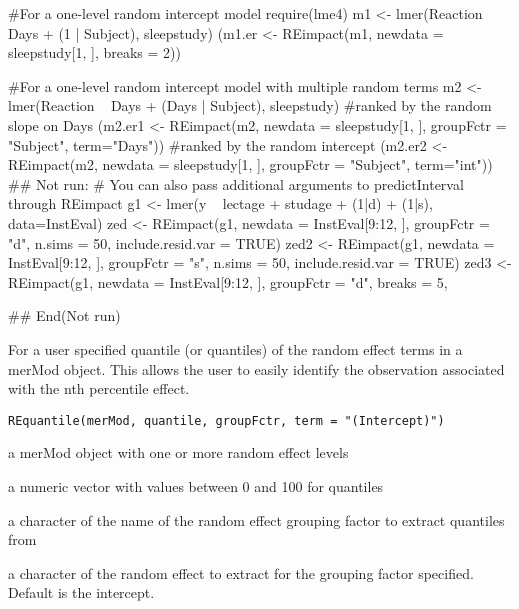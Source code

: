 \documentclass[letterpaper]{book}
\begin{document}
\begin{Examples}
\begin{ExampleCode}
#For a one-level random intercept model
require(lme4)
m1 <- lmer(Reaction ~ Days + (1 | Subject), sleepstudy)
(m1.er <- REimpact(m1, newdata = sleepstudy[1, ], breaks = 2))

#For a one-level random intercept model with multiple random terms
m2 <- lmer(Reaction ~ Days + (Days | Subject), sleepstudy)
#ranked by the random slope on Days
(m2.er1 <- REimpact(m2,  newdata = sleepstudy[1, ],
           groupFctr = "Subject", term="Days"))
#ranked by the random intercept
(m2.er2 <- REimpact(m2, newdata = sleepstudy[1, ],
             groupFctr = "Subject", term="int"))
## Not run: 
# You can also pass additional arguments to predictInterval through REimpact
g1 <- lmer(y ~ lectage + studage + (1|d) + (1|s), data=InstEval)
zed <- REimpact(g1, newdata = InstEval[9:12, ], groupFctr = "d", n.sims = 50,
                include.resid.var = TRUE)
zed2 <- REimpact(g1, newdata = InstEval[9:12, ], groupFctr = "s", n.sims = 50,
                 include.resid.var = TRUE)
zed3 <- REimpact(g1, newdata = InstEval[9:12, ], groupFctr = "d", breaks = 5,

## End(Not run)

\end{ExampleCode}
\end{Examples}
%
\begin{Description}\relax
For a user specified quantile (or quantiles) of the random effect
terms in a merMod object. This allows the user to easily identify the observation
associated with the nth percentile effect.
\end{Description}
%
\begin{Usage}
\begin{verbatim}
REquantile(merMod, quantile, groupFctr, term = "(Intercept)")
\end{verbatim}
\end{Usage}
%
\begin{Arguments}
\begin{ldescription}
\item[\code{merMod}] a merMod object with one or more random effect levels

\item[\code{quantile}] a numeric vector with values between 0 and 100 for quantiles

\item[\code{groupFctr}] a character of the name of the random effect grouping factor to extract
quantiles from

\item[\code{term}] a character of the random effect to extract for the grouping factor
specified. Default is the intercept.
\end{ldescription}
\end{Arguments}
\end{document}
